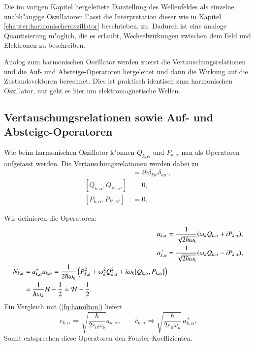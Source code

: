 Die im vorigen Kapitel hergeleitete Darstellung des Wellenfeldes als einzelne unabh"angige Oszillatoren l"asst die Interpretation dieser wie in Kapitel \ref{chapter:harmonischeroszillator} beschrieben, zu. Dadurch ist eine analoge Quantisierung m"oglich, die es erlaubt, Wechselwirkungen zwischen dem Feld und Elektronen zu beschreiben.

Analog zum harmonischen Oszillator werden zuerst die Vertauschungsrelationen und die Auf- und Absteige-Operatoren hergeleitet und dann die Wirkung auf die Zustandsvektoren berechnet. Dies ist praktisch identisch zum harmonischen Oszillator, nur geht es hier um elektromagnetische Wellen.

\subsection{Vertauschungsrelationen sowie Auf- und Absteige-Operatoren}
Wie beim harmonischen Oszillator k"onnen $Q_{k,\alpha}$ und $P_{k,\alpha}$ nun als Operatoren aufgefasst werden. Die Vertauschungsrelationen werden dabei zu
\begin{align*}
[Q_{k,\alpha}, P_{k',\alpha'}] &= i \hbar \delta_{kk'}\delta_{aa'}, \\
[Q_{k,\alpha}, Q_{k',\alpha'}] &= 0, \\
[P_{k,\alpha}, P_{k',\alpha'}] &= 0.
\end{align*}

Wir definieren die Operatoren:
\begin{align*}
a_{k,\alpha} &= \frac{1}{\sqrt{2 \hbar \omega_k}} (\omega_k Q_{k,\alpha} + iP_{k,\alpha}), \\
a^+_{k,\alpha} &= \frac{1}{\sqrt{2 \hbar \omega_k}} (\omega_k Q_{k,\alpha} - iP_{k,\alpha}),\\
\begin{split}
N_{k,\alpha} &= a^+_{k,\alpha} a_{k,\alpha} = \frac{1}{2 \hbar \omega_k} \left(P_{k,\alpha}^2 + \omega_k^2 Q_{k,\alpha}^2 + i\omega_k [Q_{k,\alpha},P_{k,\alpha}] \right) \\
 &= \frac{1}{ \hbar \omega_k } H - \frac{1}{2} = {\cal H} - \frac{1}{2}.
\end{split}
\end{align*}
Ein Vergleich mit (\ref{fq:hamilton}) liefert
\begin{equation} \label{fq:opp_fourier}
 c_{k,\alpha} \Rightarrow \sqrt{\frac{\hbar}{2 \varepsilon_0 \omega_k}} a_{k,\alpha}, \qquad 
 \bar{c}_{k,\alpha} \Rightarrow \sqrt{\frac{\hbar}{2 \varepsilon_0 \omega_k}} \, a^+_{k,\alpha}.
\end{equation}
Somit entsprechen diese Operatoren den Fourier-Koeffizienten.

